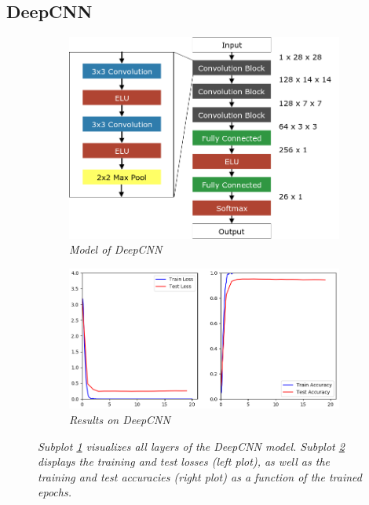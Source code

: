 \documentclass[a4paper]{article}
\begin{document}
\subsection{DeepCNN}\label{sec:deepCNN}

\begin{figure}
    \centering
    \hspace{-1cm}
    \begin{subfigure}[b]{0.4\textwidth}
        \includegraphics[height=0.25\paperwidth]{graphics/nets/CNN13}
        \caption{\textit{Model of DeepCNN}}
        \label{fig:deepCNN_model}
    \end{subfigure}
    \begin{subfigure}[b]{0.5\textwidth}
        \includegraphics[height=0.25\paperwidth]{graphics/nets/CNN13_Results}
        \caption{\textit{Results on DeepCNN}}
        \label{fig:deepCNN_results}
    \end{subfigure}
    \caption{\textit{Subplot \ref{fig:deepCNN_model} visualizes all layers of the DeepCNN model. Subplot \ref{fig:deepCNN_results} displays the training and test losses (left plot), as well as the training and test accuracies (right plot) as a function of the trained epochs.}}\label{fig:deepCNN}
\end{figure}
\end{document}
